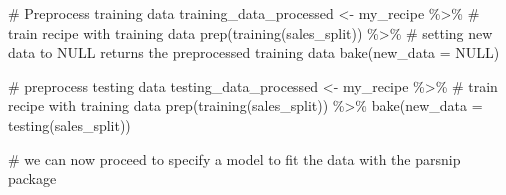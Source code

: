\documentclass[
  letterpaper,
  DIV=11,
  numbers=noendperiod]{scrartcl}
\newenvironment{Shaded}{\begin{snugshade}}{\end{snugshade}}
\newcommand{\AttributeTok}[1]{\textcolor[rgb]{0.40,0.45,0.13}{#1}}
\newcommand{\CommentTok}[1]{\textcolor[rgb]{0.37,0.37,0.37}{#1}}
\newcommand{\ConstantTok}[1]{\textcolor[rgb]{0.56,0.35,0.01}{#1}}
\newcommand{\FunctionTok}[1]{\textcolor[rgb]{0.28,0.35,0.67}{#1}}
\newcommand{\NormalTok}[1]{\textcolor[rgb]{0.00,0.23,0.31}{#1}}
\newcommand{\OtherTok}[1]{\textcolor[rgb]{0.00,0.23,0.31}{#1}}
\newcommand{\SpecialCharTok}[1]{\textcolor[rgb]{0.37,0.37,0.37}{#1}}
\begin{document}
\begin{Shaded}
\begin{Highlighting}[]
\CommentTok{\# Preprocess training data}
\NormalTok{training\_data\_processed }\OtherTok{\textless{}{-}}\NormalTok{ my\_recipe }\SpecialCharTok{\%\textgreater{}\%} 
  \CommentTok{\# train recipe with training data}
  \FunctionTok{prep}\NormalTok{(}\FunctionTok{training}\NormalTok{(sales\_split)) }\SpecialCharTok{\%\textgreater{}\%} 
  \CommentTok{\# setting new data to NULL returns the preprocessed training data}
  \FunctionTok{bake}\NormalTok{(}\AttributeTok{new\_data =} \ConstantTok{NULL}\NormalTok{)}
  

\CommentTok{\# preprocess testing data}
\NormalTok{testing\_data\_processed }\OtherTok{\textless{}{-}}\NormalTok{ my\_recipe }\SpecialCharTok{\%\textgreater{}\%} 
  \CommentTok{\# train recipe with training data}
  \FunctionTok{prep}\NormalTok{(}\FunctionTok{training}\NormalTok{(sales\_split)) }\SpecialCharTok{\%\textgreater{}\%} 
  \FunctionTok{bake}\NormalTok{(}\AttributeTok{new\_data =} \FunctionTok{testing}\NormalTok{(sales\_split))}
  
\CommentTok{\# we can now proceed to specify a model to fit the data with the parsnip package}
\end{Highlighting}
\end{Shaded}
\end{document}
